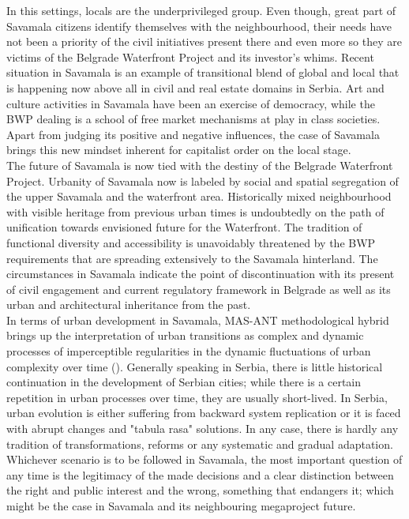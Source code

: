 \documentclass[11pt]{report}
\begin{document}
{{{In this settings, locals are the underprivileged group.
Even though, great part of Savamala citizens identify themselves with the neighbourhood, their needs have not been a priority of the civil initiatives  present there and even more so they are victims of the Belgrade Waterfront Project and its investor's whims.
Recent situation in Savamala is an example of transitional blend of global and local that is happening now above all in civil and real estate domains in Serbia.
Art and culture activities in Savamala have been an exercise of democracy, while the BWP dealing is a school of free market mechanisms at play in class societies.
Apart from judging its positive and negative influences, the case of Savamala brings this new mindset inherent for capitalist order on the local stage.
\\

The future of Savamala is now tied with the destiny of the Belgrade Waterfront Project.
Urbanity of Savamala now is labeled by social and spatial segregation of the upper Savamala and the waterfront area.
Historically mixed neighbourhood with visible heritage from previous urban times is undoubtedly on the path of unification towards envisioned future for the Waterfront.
The tradition of functional diversity and accessibility is unavoidably threatened by the BWP requirements that are spreading extensively to the Savamala hinterland.
The circumstances in Savamala indicate the point of discontinuation with its present of civil engagement and current regulatory framework in Belgrade as well as its urban and architectural inheritance from the past.
\\

In terms of urban development in Savamala, MAS-ANT methodological hybrid brings up the interpretation of urban transitions as complex and dynamic processes of imperceptible regularities in the dynamic fluctuations of urban complexity over time (\href{Lee}{\citealt{lee_fernand_2012}}).
Generally speaking in Serbia, there is little historical continuation in the development of Serbian cities; while there is a certain repetition in urban processes over time, they are usually short-lived.
In Serbia, urban evolution is either suffering from backward system replication or it is faced with abrupt changes and "tabula rasa" solutions. In any case, there is hardly any tradition of transformations, reforms or any systematic and gradual adaptation.
Whichever scenario is to be followed in Savamala, the most important question of any time is the legitimacy of the made decisions and a clear distinction between the right and public interest and the wrong, something that endangers it; which might be the case in Savamala and its neighbouring megaproject future.

}}}
\end{document}
